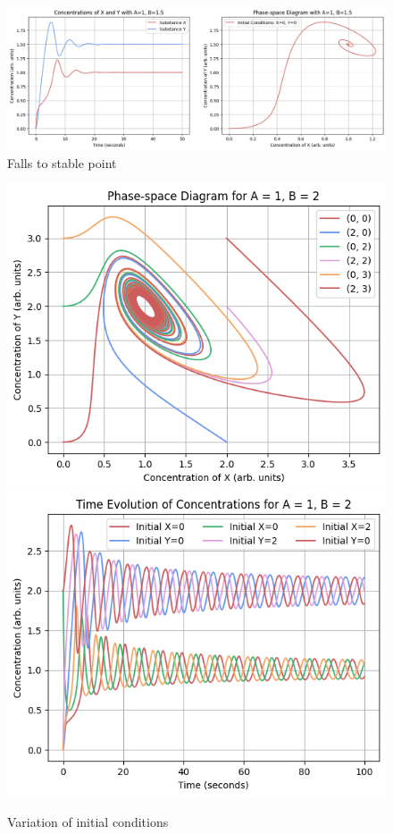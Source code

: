 \documentclass[reprint, amsmath, amssymb, aps]{revtex4-2}
\begin{document}
\begin{figure}
\includegraphics[width=2\columnwidth]{combinedPlot_fallToStable.png}
\caption{\label{fig:combinedPlot}Falls to stable point}
\end{figure}

\begin{figure}
\includegraphics[width=0.85\columnwidth]{variationOfInitialConditions_phase.png}
\includegraphics[width=0.85\columnwidth]{variationOfInitialConditions_evolution.png}
\caption{\label{fig:combinedPlot}Variation of initial conditions}
\end{figure}
\end{document}
